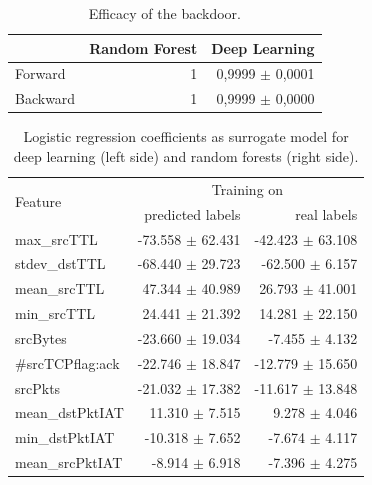 \documentclass[sigconf,nonacm]{acmart}
\begin{document}
\begin{table}
\caption{Efficacy of the backdoor.}
\begin{tabular}{l r r} \toprule
 & Random Forest & Deep Learning \\ \midrule
Forward & 1 & 0,9999 $\pm$ 0,0001 \\
Backward & 1 & 0,9999 $\pm$ 0,0000 \\
\bottomrule
\end{tabular}
\end{table}



\begin{table}
 \caption{Logistic regression coefficients as surrogate model for deep learning (left side) and random forests (right side).} \label{tab:logreg_coeff}
\begin{tabular}{l r r} \toprule 
\multirow{2}{*}{Feature} & \multicolumn{2}{c}{Training on} \\
  & predicted labels & real labels \\ \midrule
         max\_srcTTL &  -73.558 $\pm$ 62.431 &  -42.423 $\pm$ 63.108 \\
       stdev\_dstTTL &  -68.440 $\pm$ 29.723 &  -62.500 $\pm$ 6.157 \\
        mean\_srcTTL &   47.344 $\pm$ 40.989 &   26.793 $\pm$ 41.001 \\
         min\_srcTTL &   24.441 $\pm$ 21.392 &   14.281 $\pm$ 22.150 \\
            srcBytes &  -23.660 $\pm$ 19.034 &   -7.455 $\pm$ 4.132 \\
    \#srcTCPflag:ack &  -22.746 $\pm$ 18.847 &  -12.779 $\pm$ 15.650 \\
             srcPkts &  -21.032 $\pm$ 17.382 &  -11.617 $\pm$ 13.848 \\
     mean\_dstPktIAT &   11.310 $\pm$ 7.515 &    9.278 $\pm$ 4.046 \\
      min\_dstPktIAT &  -10.318 $\pm$ 7.652 &   -7.674 $\pm$ 4.117 \\
     mean\_srcPktIAT &   -8.914 $\pm$ 6.918 &   -7.396 $\pm$ 4.275 \\

\end{tabular}
\end{table}
\end{document}
